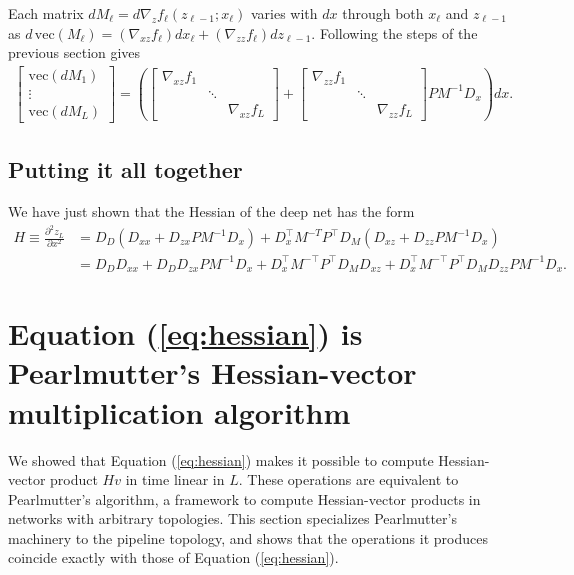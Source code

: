 \documentclass{article}
\begin{document}
Each matrix $dM_\ell = d \nabla_z f_\ell(z_{\ell-1}; x_\ell)$ varies with $dx$ through both $x_\ell$ and $z_{\ell -1}$
as $d\,\mathrm{vec} \left(M_\ell\right) = \left(\nabla_{xz} f_\ell\right) dx_\ell + \left(\nabla_{zz} f_\ell\right)
  dz_{\ell-1}$. Following the steps of the previous section gives
\begin{align}
  \begin{bmatrix}
    \mathrm{vec}\left(dM_1\right) \\
    \vdots                        \\
    \mathrm{vec}\left(dM_L\right)
  \end{bmatrix}
  =
  \left(
  \begin{bmatrix}
    \nabla_{xz} f_1 &        &                 \\
                    & \ddots &                 \\
                    &        & \nabla_{xz} f_L
  \end{bmatrix}
  +
  \begin{bmatrix}
    \nabla_{zz} f_1 \\ &\ddots& \\ && \nabla_{zz} f_L
  \end{bmatrix}
  P M^{-1} D_x
  \right)dx.
\end{align}

\subsection{Putting it all together}

We have just shown that the Hessian of the deep net has the form
\begin{align}
  H \equiv \frac{\partial^2 z_L}{\partial x^2}
   & = D_D \left(D_{xx} + D_{zx} PM^{-1} D_x\right) + D_x^\top M^{-T}P^\top D_M \left(D_{xz}+D_{zz}P M^{-1}D_x\right)           \\
   & = D_DD_{xx}  + D_DD_{zx} PM^{-1} D_x + D_x^\top M^{-\top}P^\top D_M D_{xz}+D_x^\top M^{-\top}P^\top D_M D_{zz}P M^{-1}D_x.
\end{align}



\section{Equation (\ref{eq:hessian}) is Pearlmutter's Hessian-vector multiplication algorithm}
\label{sec:pearlmutter}

We showed that Equation (\ref{eq:hessian}) makes it possible to compute Hessian-vector product $H v$ in time linear in
$L$. These operations are equivalent to Pearlmutter's \cite{pearlmutter94} algorithm, a framework to compute
Hessian-vector products in networks with arbitrary topologies. This section specializes Pearlmutter's machinery to the
pipeline topology, and shows that the operations it produces coincide exactly with those of Equation
(\ref{eq:hessian}).
\end{document}
